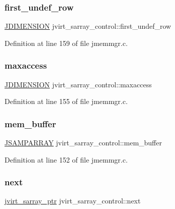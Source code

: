\subsubsection{\texorpdfstring{first\_undef\_row}{first\_undef\_row}}
{\footnotesize\ttfamily \mbox{\hyperlink{jmorecfg_8h_a04ed4674f6f1d0d50ec241531e38274f}{J\+D\+I\+M\+E\+N\+S\+I\+ON}} jvirt\+\_\+sarray\+\_\+control\+::first\+\_\+undef\+\_\+row}



Definition at line 159 of file jmemmgr.\+c.

\mbox{\label{structjvirt__sarray__control_a719350d4faf724c6617a5892aae8ec2a}} 
\subsubsection{\texorpdfstring{maxaccess}{maxaccess}}
{\footnotesize\ttfamily \mbox{\hyperlink{jmorecfg_8h_a04ed4674f6f1d0d50ec241531e38274f}{J\+D\+I\+M\+E\+N\+S\+I\+ON}} jvirt\+\_\+sarray\+\_\+control\+::maxaccess}



Definition at line 155 of file jmemmgr.\+c.

\mbox{\label{structjvirt__sarray__control_abc1f86c02141d80dc5d443e57a1d36d6}} 
\subsubsection{\texorpdfstring{mem\_buffer}{mem\_buffer}}
{\footnotesize\ttfamily \mbox{\hyperlink{jpeglib_8h_ac9d5d1b829ed51769db69a37271a7e91}{J\+S\+A\+M\+P\+A\+R\+R\+AY}} jvirt\+\_\+sarray\+\_\+control\+::mem\+\_\+buffer}



Definition at line 152 of file jmemmgr.\+c.

\mbox{\label{structjvirt__sarray__control_aed2d873c89cff97caf93e77b279bdecb}} 
\subsubsection{\texorpdfstring{next}{next}}
{\footnotesize\ttfamily \mbox{\hyperlink{jpeglib_8h_abc0b975077507c35b5a577e3ce9e4d91}{jvirt\+\_\+sarray\+\_\+ptr}} jvirt\+\_\+sarray\+\_\+control\+::next}



